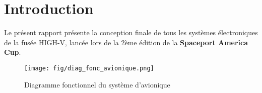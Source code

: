 \chapter{Introduction}
\label{chap:intro}

Le présent rapport présente la conception finale de tous les systèmes
électroniques de la fusée HIGH-V, lancée lors de la 2ème édition de la
\textbf{Spaceport America Cup}.

\begin{figure}[H]
	\center
	\texttt{[image: fig/diag\_fonc\_avionique.png]}
	\caption{Diagramme fonctionnel du système d'avionique}
	\label{f:diag_fonc_avionique}
\end{figure}

